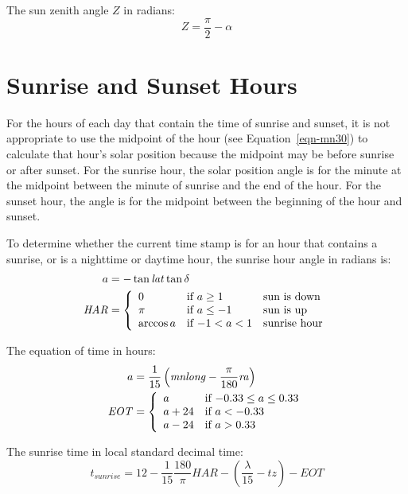 \documentclass[12pt,letterpaper]{article}
\begin{document}
The sun zenith angle $Z$ in radians:
\begin{equation}\label{eqn-zen}
Z = \frac{\pi}{2}-\alpha
\end{equation}

\section{Sunrise and Sunset Hours}\label{sec-sunriseset}

For the hours of each day that contain the time of sunrise and sunset, it is not appropriate to use the midpoint of the hour (see Equation~\ref{eqn-mn30}) to calculate that hour's solar position because the midpoint may be before sunrise or after sunset. For the sunrise hour, the solar position angle is for the minute at the midpoint between the minute of sunrise and the end of the hour. For the sunset hour, the angle is for the midpoint between the beginning of the hour and sunset.

To determine whether the current time stamp is for an hour that contains a sunrise, or is a nighttime or daytime hour, the sunrise hour angle in radians is:
\begin{align}\label{eqn-sunup}
a &= -\tan \mathit{lat}\tan\delta\notag\\
\mathit{HAR} &= 
\left\{
   \begin{array}{lll}
      0 & \text{if $a\geq1$} & \text{sun is down}\\
      \pi & \text{if $a\leq-1$} & \text{sun is up}\\
      \arccos a & \text{if $-1<a<1$} & \text{sunrise hour}
   \end{array}
\right. 
\end{align}

The equation of time in hours:
\begin{align}\label{eqn-eot}
a &= \frac{1}{15}\left(\mathit{mnlong} - \frac{\pi}{180}\mathit{ra}\right)\notag\\
\mathit{EOT} &= 
\left\{
   \begin{array}{ll}
     a & \text{if $-0.33 \leq a \leq 0.33$}\\
     a + 24 & \text{if $a<-0.33$}\\
     a - 24 & \text{if $a>0.33$}
   \end{array}
\right. 
\end{align}

The sunrise time in local standard decimal time:
\begin{equation}
t_{sunrise} = 12 - \frac{1}{15} \frac{180}{\pi}\mathit{HAR} - \left(\frac{\lambda}{15} - \mathit{tz}\right)-\mathit{EOT}
\end{equation}
\end{document}
